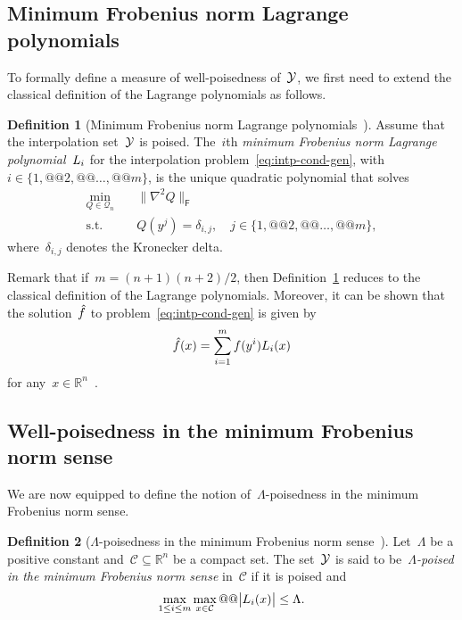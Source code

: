 \documentclass{article}
\makeatletter
\newcounter{cite}
\numberwithin{equation}{section}
\theoremstyle{definition}
\newtheorem{definition}{Definition}[section]
\theoremstyle{plain}
\theoremstyle{remark}
\newcommand*{\abs}[2][]{#1\lvert#2#1\rvert}
\newcommand*{\norm}[2][]{#1\lVert#2#1\rVert}
\newcommand*{\set}[2][]{#1\{#2#1\}}
\newcommand*{\obj}{f}
\newcommand*{\objm}[1][]{\hat{\obj}\ifblank{#1}{}{^{#1}}}
\newcommand*{\R}{\mathbb{R}}
\newcommand*{\lagp}[1][]{L\ifblank{#1}{}{_{#1}}}
\newcommand*{\xpt}[1][]{\mathcal{Y}\ifblank{#1}{}{^{@#1}}}
\newcommand*{\qpoly}{\mathcal{Q}_n}
\makeatother
\begin{document}
\subsection{Minimum Frobenius norm Lagrange polynomials}

To formally define a measure of well-poisedness of~$\xpt$, we first need to extend the classical definition of the Lagrange polynomials as follows.

\begin{definition}[Minimum Frobenius norm Lagrange polynomials~{\cite[Definition~5.1]{Conn_Scheinberg_Vicente_2009}}]
    \label{def:min-norm-lagp}
    Assume that the interpolation set~$\xpt$ is poised.
    The~$i$th \emph{minimum Frobenius norm Lagrange polynomial}~$\lagp[i]$ for the interpolation problem~\eqref{eq:intp-cond-gen}, with~$i \in \set{1, @@ 2, @@ \dots, @@ m}$, is the unique quadratic polynomial that solves
    \begin{equation*}
        \begin{aligned}
            \min_{Q \in \qpoly} & \quad \norm[\big]{\nabla^2 Q}_{\mathsf{F}}\\
            \text{s.t.}         & \quad Q(y^j) = \delta_{i, j}, \quad j \in \set{1, @@ 2, @@ \dots, @@ m},
        \end{aligned}
    \end{equation*}
    where~$\delta_{i, j}$ denotes the Kronecker delta.
\end{definition}

Remark that if~$m = (n + 1) (n + 2) / 2$, then Definition~\ref{def:min-norm-lagp} reduces to the classical definition of the Lagrange polynomials.
Moreover, it can be shown that the solution~$\objm$ to problem~\eqref{eq:intp-cond-gen} is given by
\begin{equation*}
    \objm(x) = \sum_{i = 1}^m \obj(y^i) \lagp[i](x)
\end{equation*}
for any~$x \in \R^n$~\cite[Lemma~5.2]{Conn_Scheinberg_Vicente_2009}.

\subsection{Well-poisedness in the minimum Frobenius norm sense}

We are now equipped to define the notion of~$\Lambda$-poisedness in the minimum Frobenius norm sense.

\begin{definition}[$\Lambda$-poisedness in the minimum Frobenius norm sense~{\cite[Definition~5.6]{Conn_Scheinberg_Vicente_2009}}]
    \label{def:lambda-p}
    Let~$\Lambda$ be a positive constant and~$\mathcal{C} \subseteq \R^n$ be a compact set.
    The set~$\xpt$ is said to be~\emph{$\Lambda$-poised in the minimum Frobenius norm sense} in~$\mathcal{C}$ if it is poised and
    \begin{equation*}
        \max_{1 \le i \le m} \max_{x \in \mathcal{C}} @@ \abs[\big]{\lagp[i](x)} \le \Lambda.
    \end{equation*}
\end{definition}
\end{document}
